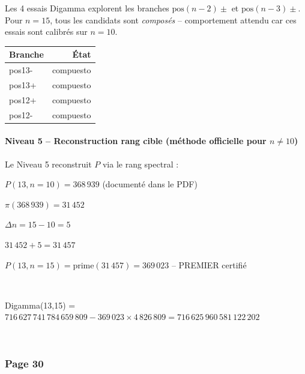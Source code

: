 \documentclass[11pt,a4paper]{article}
\begin{document}
Les 4 essais Digamma explorent les branches $\text{pos}(n-2)\pm$ et $\text{pos}(n-3)\pm$. Pour $n=15$, tous les candidats sont \emph{composés} -- comportement attendu car ces essais sont calibrés sur $n=10$.

\begin{center}
\begin{tabular}{@{}lr@{}}
\toprule
\rowcolor{spectralgris}
\textbf{Branche} & \textbf{État} \\
\midrule
pos13- & compuesto \\
pos13+ & compuesto \\
pos12+ & compuesto \\
pos12- & compuesto \\
\bottomrule
\end{tabular}
\end{center}

\vspace{0.3cm}

\paragraph{Niveau 5 -- Reconstruction rang cible (méthode officielle pour $n \neq 10$)}

Le Niveau 5 reconstruit $P$ via le rang spectral :

\begin{boitealgo}[Reconstruction rang\_cible -- k=13]
\begin{description}[nosep]
  \item[Ancrage] $P(13, n=10) = 368\,939$ (documenté dans le PDF)
  \item[Rang de base] $\pi(368\,939) = 31\,452$
  \item[Écart] $\Delta n = 15 - 10 = 5$
  \item[Rang cible] $31\,452 + 5 = 31\,457$
  \item[Résultat] $P(13, n=15) = \text{prime}(31\,457) = 369\,023$ -- \textcolor{vert}{PREMIER certifié}
\end{description}
\end{boitealgo}
\

Digamma(13,15) = $716\,627\,741\,784\,659\,809 - 369\,023 \times 4\,826\,809 = 716\,625\,960\,581\,122\,202$

\vspace{0.5cm}
\


\subsubsection*{Page 30}
\end{document}
